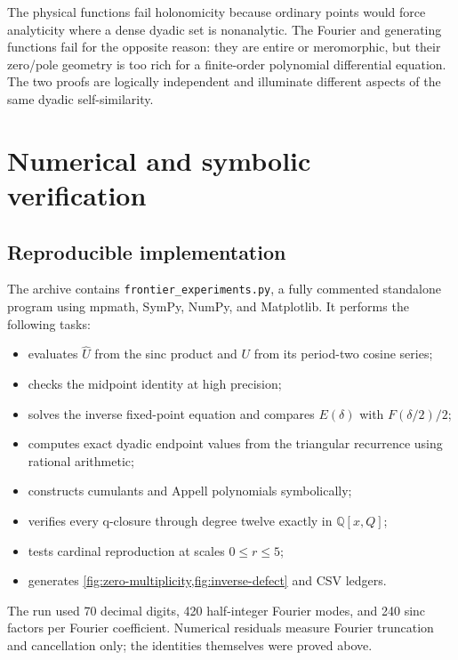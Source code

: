 \documentclass[11pt,oneside]{article}
\theoremstyle{definition}
\theoremstyle{remark}
\newcommand{\Q}{\mathbb Q}
\begin{document}
\begin{corpusdeductionbox}[title=Two-sided holonomic exclusion]
The physical functions fail holonomicity because ordinary points would force analyticity where a dense dyadic set is nonanalytic.  The Fourier and generating functions fail for the opposite reason: they are entire or meromorphic, but their zero/pole geometry is too rich for a finite-order polynomial differential equation.  The two proofs are logically independent and illuminate different aspects of the same dyadic self-similarity.
\end{corpusdeductionbox}

\section{Numerical and symbolic verification}
\label{sec:numerics}

\subsection{Reproducible implementation}
The archive contains \texttt{frontier\_experiments.py}, a fully commented standalone program using mpmath, SymPy, NumPy, and Matplotlib.  It performs the following tasks:
\begin{itemize}
\item evaluates $\widehat U$ from the sinc product and $U$ from its period-two cosine series;
\item checks the midpoint identity at high precision;
\item solves the inverse fixed-point equation and compares $E(\delta)$ with $F(\delta/2)/2$;
\item computes exact dyadic endpoint values from the triangular recurrence using rational arithmetic;
\item constructs cumulants and Appell polynomials symbolically;
\item verifies every q-closure through degree twelve exactly in $\Q[x,Q]$;
\item tests cardinal reproduction at scales $0\le r\le5$;
\item generates \cref{fig:zero-multiplicity,fig:inverse-defect} and CSV ledgers.
\end{itemize}
The run used 70 decimal digits, 420 half-integer Fourier modes, and 240 sinc factors per Fourier coefficient.  Numerical residuals measure Fourier truncation and cancellation only; the identities themselves were proved above.
\end{document}
